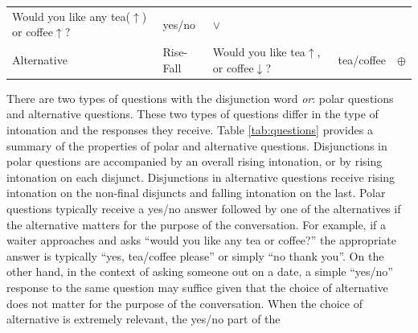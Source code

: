 \documentclass[oneside]{report}
\theoremstyle{definition}
\theoremstyle{definition}
\theoremstyle{definition}
\theoremstyle{remark}
\begin{document}
\begin{longtable}[]{@{}llllc@{}}
\begin{minipage}[t]{0.39\columnwidth}
Would you like any tea(\(\uparrow\)) or coffee\(\uparrow\)?\strut
\end{minipage} & \begin{minipage}[t]{0.10\columnwidth}\raggedright\strut
yes/no\strut
\end{minipage} & \begin{minipage}[t]{0.14\columnwidth}\centering\strut
\(\lor\)\strut
\end{minipage}\tabularnewline
\begin{minipage}[t]{0.12\columnwidth}\raggedright\strut
Alternative\strut
\end{minipage} & \begin{minipage}[t]{0.11\columnwidth}\raggedright\strut
Rise-Fall\strut
\end{minipage} & \begin{minipage}[t]{0.39\columnwidth}\raggedright\strut
Would you like tea\(\uparrow\), or coffee\(\downarrow\)?\strut
\end{minipage} & \begin{minipage}[t]{0.10\columnwidth}\raggedright\strut
tea/coffee\strut
\end{minipage} & \begin{minipage}[t]{0.14\columnwidth}\centering\strut
\(\oplus\)\strut
\end{minipage}\tabularnewline
\bottomrule
\end{longtable}
There are two types of questions with the disjunction word \emph{or}:
polar questions and alternative questions. These two types of questions
differ in the type of intonation and the responses they receive. Table
\ref{tab:questions} provides a summary of the properties of polar and
alternative questions. Disjunctions in polar questions are accompanied
by an overall rising intonation, or by rising intonation on each
disjunct. Disjunctions in alternative questions receive rising
intonation on the non-final disjuncts and falling intonation on the
last. Polar questions typically receive a yes/no answer followed by one
of the alternatives if the alternative matters for the purpose of the
conversation. For example, if a waiter approaches and asks ``would you
like any tea or coffee?'' the appropriate answer is typically ``yes,
tea/coffee please'' or simply ``no thank you''. On the other hand, in
the context of asking someone out on a date, a simple ``yes/no''
response to the same question may suffice given that the choice of
alternative does not matter for the purpose of the conversation. When
the choice of alternative is extremely relevant, the yes/no part of the
\end{document}
